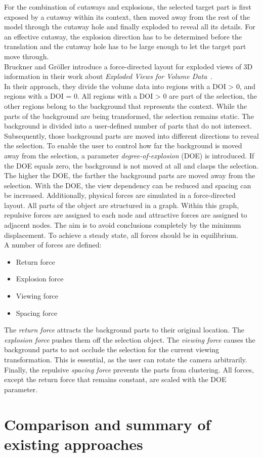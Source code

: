 For the combination of cutaways and explosions, the selected target part is first exposed by a cutaway within its context, then moved away from the rest of the model through the cutaway hole and finally exploded to reveal all its details. For an effective cutaway, the explosion direction has to be determined before the translation and the cutaway hole has to be large enough to let the target part move through.\\
\newline
Bruckner and Gr{\"o}ller introduce a force-directed layout for exploded views of 3D information in their work about \emph{Exploded Views for Volume Data}~\cite{jour:explodedView}.\\
In their approach, they divide the volume data into regions with a DOI > 0, and regions with a DOI = 0. All regions with a DOI > 0 are part of the selection, the other regions belong to the background that represents the context. While the parts of the background are being transformed, the selection remains static. The background is divided into a user-defined number of parts that do not intersect. Subsequently, those background parts are moved into different directions to reveal the selection. To enable the user to control how far the background is moved away from the selection, a parameter \emph{degree-of-explosion} (DOE) is introduced. If the DOE equals zero, the background is not moved at all and clasps the selection. The higher the DOE, the farther the background parts are moved away from the selection. With the DOE, the view dependency can be reduced and spacing can be increased. Additionally, physical forces are simulated in a force-directed layout. All parts of the object are structured in a graph. Within this graph, repulsive forces are assigned to each node and attractive forces are assigned to adjacent nodes. The aim is to avoid conclusions completely by the minimum displacement. To achieve a steady state, all forces should be in equilibrium.\\
A number of forces are defined:
\begin{itemize}
	\item Return force
	\item Explosion force
	\item Viewing force
	\item Spacing force
\end{itemize}
The \emph{return force} attracts the background parts to their original location. The \emph{explosion force} pushes them off the selection object. The \emph{viewing force} causes the background parts to not occlude the selection for the current viewing transformation. This is essential, as the user can rotate the camera arbitrarily. Finally, the repulsive \emph{spacing force} prevents the parts from clustering. All forces, except the return force that remains constant, are scaled with the DOE parameter.\\

\section{Comparison and summary of existing approaches}



